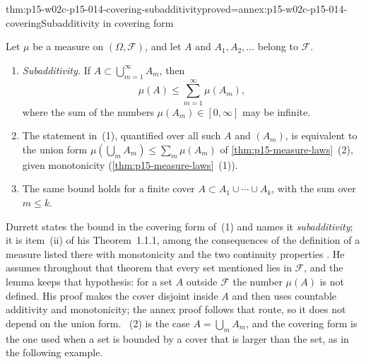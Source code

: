 \begin{hblemma}{thm:p15-w02c-p15-014-covering-subadditivity}{proved=annex:p15-w02c-p15-014-covering}{Subadditivity in covering form}
\par\nobreak
Let \(\mu\) be a measure on \((\Omega,\mathcal F)\), and let \(A\) and
\(A_1,A_2,\ldots\) belong to \(\mathcal F\).
\begin{enumerate}
\item \emph{Subadditivity.} If \(A\subset\bigcup_{m=1}^\infty A_m\), then
      \[
       \mu(A)\leq\sum_{m=1}^\infty\mu(A_m),
      \]
      where the sum of the numbers \(\mu(A_m)\in[0,\infty]\) may be
      infinite.
\item The statement in~(1), quantified over all such \(A\) and
      \((A_m)\), is equivalent to the union form
      \(\mu(\bigcup_mA_m)\leq\sum_m\mu(A_m)\) of
      \cref{thm:p15-measure-laws}~(2), given monotonicity
      (\cref{thm:p15-measure-laws}~(1)).
\item The same bound holds for a finite cover
      \(A\subset A_1\cup\cdots\cup A_k\), with the sum over
      \(m\leq k\).
\end{enumerate}
\end{hblemma}

Durrett states the bound in the covering form of~(1) and names it
\emph{subadditivity}; it is item~(ii) of his Theorem~1.1.1, among the
consequences of the definition of a measure listed there with
monotonicity and the two continuity properties
\cite[Theorem~1.1.1, p.~2]{DurrettPTEAuthor2019}. He assumes throughout
that theorem that every set mentioned lies in \(\mathcal F\), and the
lemma keeps that hypothesis: for a set \(A\) outside \(\mathcal F\) the
number \(\mu(A)\) is not defined. His proof makes the cover disjoint
inside \(A\) and then uses countable additivity and monotonicity; the
annex proof follows that route, so it does not depend on the union form.
~(2) is the case \(A=\bigcup_mA_m\), and the
covering form is the one used when a set is bounded by a cover that is
larger than the set, as in the following example.

